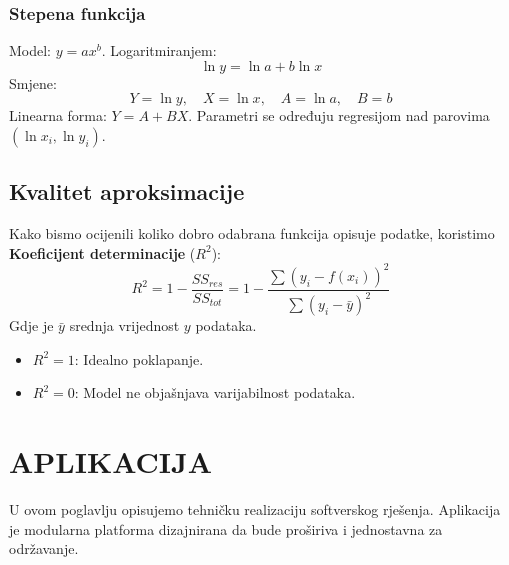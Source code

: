 \documentclass[12pt, a4paper]{article}
\begin{document}
\subsubsection{Stepena funkcija}
Model: $y = a x^b$.
Logaritmiranjem:
\begin{equation}
    \ln y = \ln a + b \ln x
\end{equation}
Smjene:
$$ Y = \ln y, \quad X = \ln x, \quad A = \ln a, \quad B = b $$
Linearna forma: $Y = A + BX$. Parametri se određuju regresijom nad parovima $(\ln x_i, \ln y_i)$.

\subsection{Kvalitet aproksimacije}
Kako bismo ocijenili koliko dobro odabrana funkcija opisuje podatke, koristimo \textbf{Koeficijent determinacije} ($R^2$):
\begin{equation}
    R^2 = 1 - \frac{SS_{res}}{SS_{tot}} = 1 - \frac{\sum (y_i - f(x_i))^2}{\sum (y_i - \bar{y})^2}
\end{equation}
Gdje je $\bar{y}$ srednja vrijednost $y$ podataka.
\begin{itemize}
    \item $R^2 = 1$: Idealno poklapanje.
    \item $R^2 = 0$: Model ne objašnjava varijabilnost podataka.
\end{itemize}


\newpage

\section{APLIKACIJA}

U ovom poglavlju opisujemo tehničku realizaciju softverskog rješenja. Aplikacija je modularna platforma dizajnirana da bude proširiva i jednostavna za održavanje.
\end{document}

